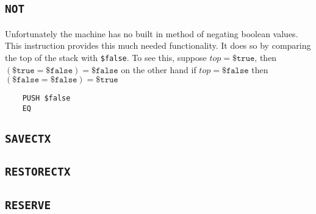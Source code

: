 \documentclass[oneside]{amsart}
\theoremstyle{definition}
\theoremstyle{remark}
\numberwithin{equation}{section}
\begin{document}
\subsection{\texttt{NOT}}
Unfortunately the machine has no built in method of negating boolean values. This instruction
provides this much needed functionality. It does so by comparing the top of the stack with
\texttt{\$false}. To see this, suppose $top = \texttt{\$true}$, then
$(\texttt{\$true} = \texttt{\$false}) = \texttt{\$false}$
on the other hand if $top = \texttt{\$false}$ then
$(\texttt{\$false} = \texttt{\$false}) = \texttt{\$true}$
\begin{lstlisting}
    PUSH $false
    EQ
\end{lstlisting}
\subsection{\texttt{SAVECTX}}
\subsection{\texttt{RESTORECTX}}
\subsection{\texttt{RESERVE}}


\end{document}
